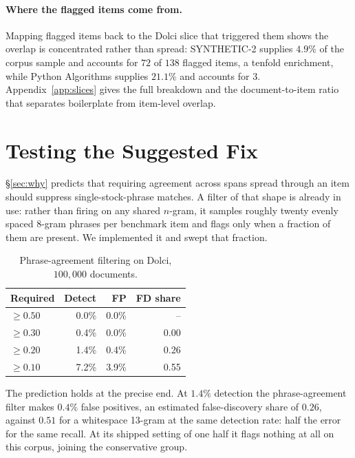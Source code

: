 \documentclass[11pt]{article}
\begin{document}
\paragraph{Where the flagged items come from.} Mapping flagged items back
to the Dolci slice that triggered them shows the overlap is concentrated rather
than spread: SYNTHETIC-2 supplies $4.9\%$ of the corpus sample and accounts for
$72$ of $138$ flagged items, a tenfold enrichment, while Python Algorithms
supplies $21.1\%$ and accounts for $3$. Appendix~\ref{app:slices} gives the
full breakdown and the document-to-item ratio that separates boilerplate from
item-level overlap.

\section{Testing the Suggested Fix}
\label{sec:phrase}

\S\ref{sec:why} predicts that requiring agreement across spans spread through an
item should suppress single-stock-phrase matches. A filter of that shape is
already in use: rather than firing on any shared $n$-gram, it samples roughly
twenty evenly spaced 8-gram phrases per benchmark item and flags only when a
fraction of them are present. We implemented it and swept that fraction.

\begin{table}[h]
\centering
\small
\setlength{\tabcolsep}{4pt}
\begin{tabular}{lrrr}
\toprule
\textbf{Required} & \textbf{Detect} & \textbf{FP} & \textbf{FD share} \\
\midrule
$\geq 0.50$ & 0.0\% & 0.0\% & -- \\
$\geq 0.30$ & 0.4\% & 0.0\% & 0.00 \\
$\geq 0.20$ & 1.4\% & 0.4\% & 0.26 \\
$\geq 0.10$ & 7.2\% & 3.9\% & 0.55 \\
\bottomrule
\end{tabular}
\caption{Phrase-agreement filtering on Dolci, $100{,}000$ documents.}
\label{tab:phrase}
\end{table}

The prediction holds at the precise end. At $1.4\%$ detection the phrase-agreement
filter makes $0.4\%$ false positives, an estimated false-discovery share of
$0.26$, against $0.51$ for a whitespace 13-gram at the same detection rate: half
the error for the same recall. At its shipped setting of one half it flags nothing
at all on this corpus, joining the conservative group.
\end{document}
